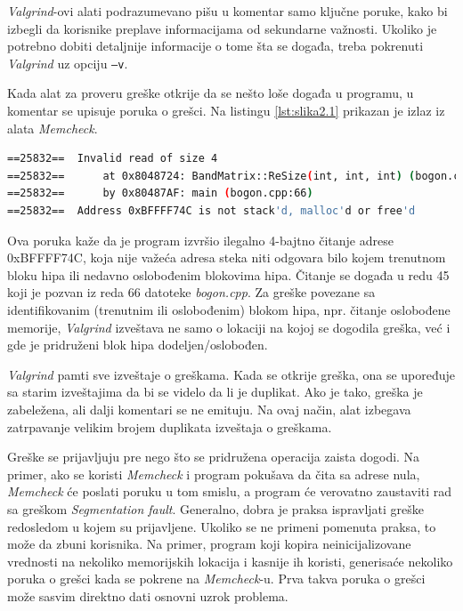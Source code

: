 \documentclass[12pt,oneside]{memoir}
\theoremstyle{plain}
\theoremstyle{definition}
\begin{document}
\textit{Valgrind}-ovi alati podrazumevano pišu u komentar samo ključne poruke, kako bi izbegli da korisnike preplave informacijama od sekundarne važnosti. Ukoliko je potrebno dobiti detaljnije informacije o tome šta se događa, treba pokrenuti \textit{Valgrind} uz opciju \texttt{–v}.

Kada alat za proveru greške otkrije da se nešto loše događa u programu, u komentar se upisuje poruka o grešci. Na listingu \ref{lst:slika2.1} prikazan je izlaz iz alata \textit{Memcheck}.

\begin{lstlisting}[style=terminal,caption={Primer izlaza alta \textit{Memcheck} \cite{ValgrindCore}}, label={lst:slika2.1},language={bash}]   
==25832==  Invalid read of size 4
==25832==      at 0x8048724: BandMatrix::ReSize(int, int, int) (bogon.cpp:45)
==25832==      by 0x80487AF: main (bogon.cpp:66)
==25832==  Address 0xBFFFF74C is not stack'd, malloc'd or free'd
\end{lstlisting}

Ova poruka kaže da je program izvršio ilegalno 4-bajtno čitanje adrese 0xBFFFF74C, koja nije važeća adresa steka niti odgovara bilo kojem trenutnom bloku hipa ili nedavno oslobođenim blokovima hipa. Čitanje se događa u redu 45 koji je pozvan iz reda 66 datoteke \textit{bogon.cpp}. Za greške povezane sa identifikovanim (trenutnim ili oslobođenim) blokom hipa, npr. čitanje oslobođene memorije, \textit{Valgrind} izveštava ne samo o lokaciji na kojoj se dogodila greška, već i gde je pridruženi blok hipa dodeljen/oslobođen.

\textit{Valgrind} pamti sve izveštaje o greškama. Kada se otkrije greška, ona se upoređuje sa starim izveštajima da bi se videlo da li je duplikat. Ako je tako, greška je zabeležena, ali dalji komentari se ne emituju. Na ovaj način, alat izbegava zatrpavanje velikim brojem duplikata izveštaja o greškama.  

Greške se prijavljuju pre nego što se pridružena operacija zaista dogodi. Na primer, ako se koristi \textit{Memcheck} i program pokušava da čita sa adrese nula, \textit{Memcheck} će poslati poruku u tom smislu, a program će verovatno zaustaviti rad sa greškom \textit{Segmentation fault}. Generalno, dobra je praksa ispravljati greške redosledom u kojem su prijavljene. Ukoliko se ne primeni pomenuta praksa, to može da zbuni korisnika. Na primer, program koji kopira neinicijalizovane vrednosti na nekoliko memorijskih lokacija i kasnije ih koristi, generisaće nekoliko poruka o grešci kada se pokrene na \textit{Memcheck}-u. Prva takva poruka o grešci može sasvim direktno dati osnovni uzrok problema. 
\end{document}
